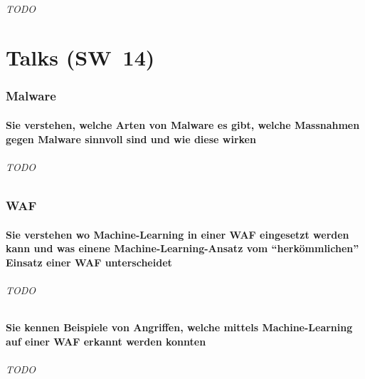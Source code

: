 \documentclass[10pt,a4paper]{article}
\begin{document}
\paragraph*{TODO}



\part{Talks (SW~14)}
\section{Malware}
\subsection*{Sie verstehen, welche Arten von Malware es gibt, welche Massnahmen gegen Malware sinnvoll sind und wie diese wirken}
\paragraph*{TODO}

\section{WAF}
\subsection*{Sie verstehen wo Machine-Learning in einer WAF eingesetzt werden kann und was einene Machine-Learning-Ansatz vom "`herkömmlichen"' Einsatz einer WAF unterscheidet}
\paragraph*{TODO}
\subsection*{Sie kennen Beispiele von Angriffen, welche mittels Machine-Learning auf einer WAF erkannt werden konnten}
\paragraph*{TODO}
\end{document}

